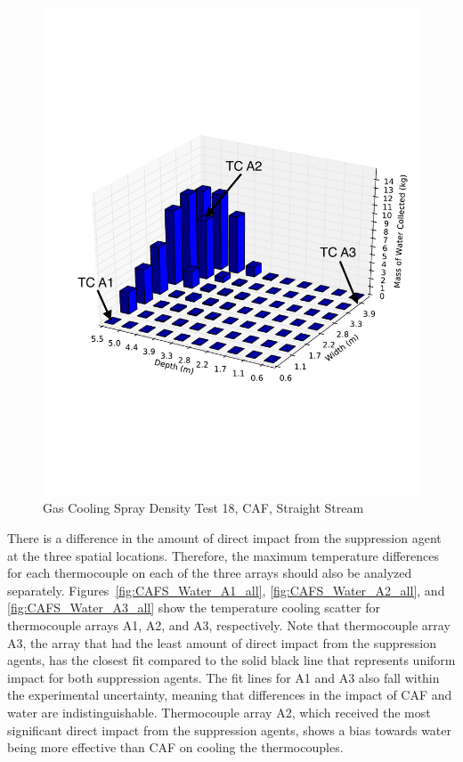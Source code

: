 \documentclass[12pt,oneside]{book}
\begin{document}
\begin{figure}[!ht]
	\includegraphics[width=.7\columnwidth]{../Figures/Bars/BB18b}
	\caption{Gas Cooling Spray Density Test 18, CAF, Straight Stream}
	\label{fig:Burn_Building_Test_18b}
\end{figure}

There is a difference in the amount of direct impact from the suppression agent at the three spatial locations. Therefore, the maximum temperature differences for each thermocouple on each of the three arrays should also be analyzed separately. Figures~\ref{fig:CAFS_Water_A1_all}, \ref{fig:CAFS_Water_A2_all}, and \ref{fig:CAFS_Water_A3_all} show the temperature cooling scatter for thermocouple arrays A1, A2, and A3, respectively. Note that thermocouple array A3, the array that had the least amount of direct impact from the suppression agents, has the closest fit compared to the solid black line that represents uniform impact for both suppression agents. The fit lines for A1 and A3 also fall within the experimental uncertainty, meaning that differences in the impact of CAF and water are indistinguishable. Thermocouple array A2, which received the most significant direct impact from the suppression agents, shows a bias towards water being more effective than CAF on cooling the thermocouples. 
\end{document}

